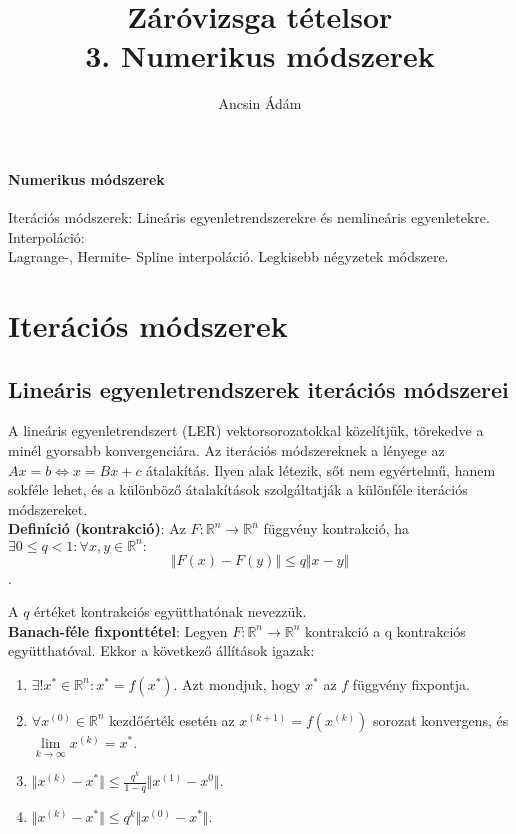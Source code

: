 \documentclass[margin=0px]{article}
\title{Záróvizsga tételsor \\ \large 3. Numerikus módszerek}
\date{}
\author{Ancsin Ádám}
\newenvironment{tetel}[1]{\paragraph{#1 \\}}{}
\begin{document}
	\maketitle
	
	\begin{tetel}{Numerikus módszerek}
	Iterációs módszerek: Lineáris egyenletrendszerekre és nemlineáris egyenletekre. Interpoláció:\\
	Lagrange-, Hermite- Spline interpoláció. Legkisebb négyzetek módszere.
	\end{tetel}
	
	
	\section{Iterációs módszerek}
	
	\subsection{Lineáris egyenletrendszerek iterációs módszerei}
	
	A lineáris egyenletrendszert (LER) vektorsorozatokkal közelítjük, törekedve a minél gyorsabb konvergenciára.
	Az iterációs módszereknek a lényege az $Ax = b \Longleftrightarrow x = Bx + c$ átalakítás. Ilyen alak létezik,
	sőt nem egyértelmű,	hanem sokféle lehet, és a különböző átalakítások szolgáltatják a különféle iterációs módszereket.\\
	
	\noindent \textbf{Definíció (kontrakció)}: Az $F: \mathbb{R}^{n} \to \mathbb{R}^{n}$ függvény kontrakció, ha
	$\exists 0 \leq q < 1 : \forall x,y \in \mathbb{R}^{n}:$ 
	\begin{displaymath}
		\Vert F(x) - F(y) \Vert \leq q \Vert x - y \Vert
	\end{displaymath}.
	
	\noindent A $q$ értéket kontrakciós együtthatónak nevezzük.\\
	
	\noindent \textbf{Banach-féle fixponttétel}: Legyen $F: \mathbb{R}^{n} \to \mathbb{R}^{n}$ kontrakció a q
	kontrakciós együtthatóval. Ekkor a következő állítások igazak:
	
	\begin{enumerate}
		\item	$\exists! x^{*} \in \mathbb{R}^{n}: x^{*} = f(x^{*})$. Azt mondjuk, hogy $x^{*}$ az $f$ függvény
		fixpontja.
		
		\item	$\forall x^{(0)} \in \mathbb{R}^{n}$ kezdőérték esetén az $x^{(k+1)} = f(x^{(k)})$ sorozat konvergens,
		és $\lim \limits_{k\to\infty} x^{(k)} = x^{*}$.
		
		\item	$\Vert x^{(k)} - x^{*}\Vert \leq \frac{q^{k}}{1-q} \Vert x^{(1)} - x^{0}\Vert$.
		
		\item	$\Vert x^{(k)} - x^{*}\Vert \leq q^{k} \Vert x^{(0)} - x^{*}\Vert$.
	\end{enumerate}
	 
\end{document}
